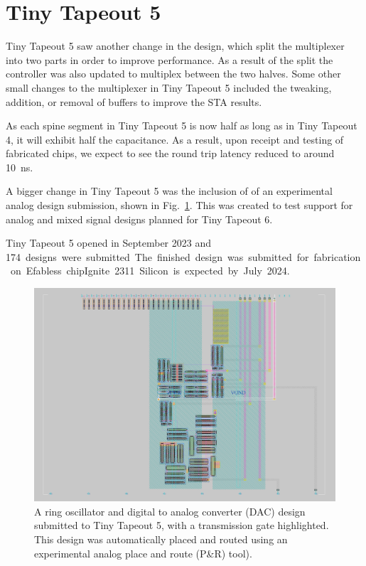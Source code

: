 \section{Tiny Tapeout 5}
\label{sec:tinytapeout5}

Tiny Tapeout 5 saw another change in the design, which split the multiplexer into two parts in order to improve performance. As a result of the split the controller was also updated to multiplex between the two halves.
Some other small changes to the multiplexer in Tiny Tapeout 5 included the tweaking, addition, or removal of buffers to improve the STA results.

As each spine segment in Tiny Tapeout 5 is now half as long as in Tiny Tapeout 4, it will exhibit half the capacitance. As a result, upon receipt and testing of fabricated chips, we expect to see the round trip latency reduced to around \qty{10}{\ns}.

A bigger change in Tiny Tapeout 5 was the inclusion of of an experimental analog design submission, shown in Fig.~\ref{fig:transmission_gate_TT05}. This was created to test support for analog and mixed signal designs planned for Tiny Tapeout 6.

Tiny Tapeout 5 opened in September 2023 and \qty{174} designs were submitted. 
The finished design was submitted for fabrication on Efabless chipIgnite 2311. Silicon is expected by July 2024.

\begin{figure}[!t]
\centering
\includegraphics[width=\columnwidth]{./Figs/tt05_transmission_gate.png}
\caption{A ring oscillator and digital to analog converter (DAC) design submitted to Tiny Tapeout 5, with a transmission gate highlighted. This design was automatically placed and routed using an experimental analog place and route (P\&R) tool).}
\label{fig:transmission_gate_TT05}
\end{figure}
